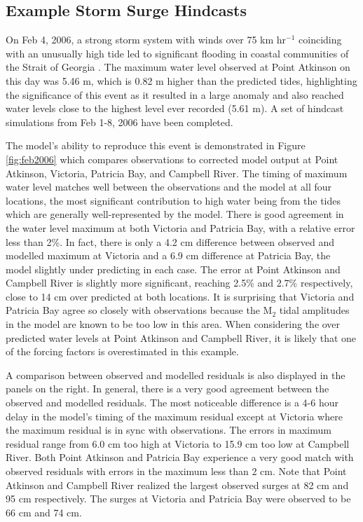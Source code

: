 \documentclass[pdftex,10pt]{article}
\begin{document}
\subsection{Example Storm Surge Hindcasts}

On Feb 4, 2006, a strong storm system with winds over 75 km hr$^{-1}$ coinciding with an unusually high tide led to significant flooding in coastal communities of the Strait of Georgia \citep{romanowski2010storm}. The maximum water level observed at Point Atkinson on this day was 5.46 m, which is 0.82 m higher than the predicted tides, highlighting the significance of this event as it resulted in a large anomaly and also reached water levels close to the highest level ever recorded (5.61 m). A set of hindcast simulations from Feb 1-8, 2006 have been completed.

The model's ability to reproduce this event is demonstrated in Figure \ref{fig:feb2006} which compares observations to corrected model output at Point Atkinson, Victoria, Patricia Bay, and Campbell River. The timing of maximum water level matches well between the observations and the model at all four locations, the most significant contribution to high water being from the tides which are generally well-represented by the model. There is good agreement in the water level maximum at both Victoria and Patricia Bay, with a relative error less than 2\%. In fact, there is only a 4.2 cm difference between observed and modelled maximum at Victoria and a 6.9 cm difference at Patricia Bay, the model slightly under predicting in each case. The error at Point Atkinson and Campbell River is slightly more significant, reaching 2.5\% and 2.7\% respectively, close to 14 cm over predicted at both locations. It is surprising that Victoria and Patricia Bay agree so closely with observations because the M$_2$ tidal amplitudes in the model are known to be too low in this area. When considering the over predicted water levels at Point Atkinson and Campbell River, it is likely that one of the forcing factors is overestimated in this example. 

A comparison between observed and modelled residuals is also displayed in the panels on the right. In general, there is a very good agreement between the observed and modelled residuals. The most noticeable difference is a 4-6 hour delay in the model's timing of the maximum residual except at Victoria where the maximum residual is in sync with observations. The errors in maximum residual range from 6.0 cm too high at Victoria to 15.9 cm too low at Campbell River. Both Point Atkinson and Patricia Bay experience a very good match with observed residuals with errors in the maximum less than 2 cm. Note that Point Atkinson and Campbell River realized the largest observed surges at 82 cm and 95 cm respectively. The surges at Victoria and Patricia Bay were observed to be 66 cm and 74 cm. 
\end{document}
